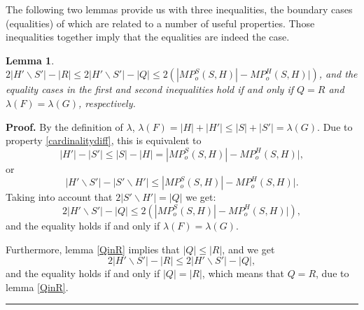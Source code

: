 \documentclass[a4paper, 12pt]{article}
\newtheorem{lemma}{Lemma}[subsection]
\newenvironment{proof}[1][Proof]{\noindent\textbf{#1.} }{\ \rule{0.5em}{0.5em}}
\begin{document}
\bigskip

The following two lemmas provide us with three inequalities, the
boundary cases (equalities) of which are related to a number of
useful properties. Those inequalities together imply that the
equalities are indeed the case.

\begin{lemma}\label{balance_upper_bound}
$2|H' \backslash S'| - |R| \leq 2|H' \backslash S'| - |Q| \leq
2(|MP_o^S(S,H)| - MP_o^H(S,H)|)$, and the equality cases in the
first and second inequalities hold if and only if $Q = R$ and
$\lambda(F) = \lambda(G)$, respectively.
\end{lemma}
\begin{proof}
By the definition of $\lambda$, $\lambda(F) = |H| + |H'| \leq |S| +
|S'| = \lambda(G)$. Due to property \ref{cardinalitydiff}, this is
equivalent to
$$|H'| - |S'| \leq |S| - |H| = |MP_o^S(S,H)| - MP_o^H(S,H)|,$$
or
$$|H' \backslash S'| - |S' \backslash H'| \leq |MP_o^S(S,H)| - MP_o^H(S,H)|.$$
Taking into account that $2|S' \backslash H'| = |Q|$ we get:
$$2|H' \backslash S'| - |Q| \leq 2(|MP_o^S(S,H)| - MP_o^H(S,H)|),$$
and the equality holds if and only if $\lambda(F) = \lambda(G)$.

Furthermore, lemma \ref{QinR} implies that $|Q| \leq |R|$, and we
get
$$2|H' \backslash S'| - |R| \leq 2|H'
\backslash S'| - |Q|,$$ and the equality holds if and only if $|Q| =
|R|$, which means that $Q = R$, due to lemma \ref{QinR}.
\end{proof}
\end{document}
